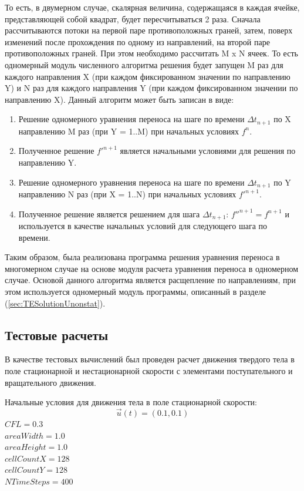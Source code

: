 \documentclass[12pt,a4paper]{article}
\begin{document}
То есть, в двумерном случае, скалярная величина, содержащаяся в каждая ячейке, представляющей собой квадрат, будет пересчитываться 2 раза. Сначала рассчитываются потоки на первой паре противоположных граней, затем, поверх изменений после прохождения по одному из направлений, на второй паре противоположных граней. При этом необходимо рассчитать M x N ячеек. То есть одномерный модуль численного алгоритма решения будет запущен M раз для каждого направления X (при каждом фиксированном значении по направлению Y) и N раз для каждого направления Y (при каждом фиксированном значении по направлению X).
Данный алгоритм может быть записан в виде:
\begin{enumerate}
\item {Решение одномерного уравнения переноса на шаге по времени $\Delta t_{n+1}$ по X направлению M раз (при Y = 1..M) при начальных условиях $f^{n}$.}
\item {Полученное решение $f'^{n+1}$ является начальными условиями для решения по направлению Y.}
\item {Решение одномерного уравнения переноса на шаге по времени $\Delta t_{n+1}$ по Y направлению N раз (при X = 1..N) при начальных условиях $f'^{n+1}$.}
\item {Полученное решение является решением для шага $\Delta t_{n+1}$: $f''^{n+1}=f^{n+1}$ и используется в качестве начальных условий для следующего шага по времени.}
\end{enumerate}

Таким образом, была реализована программа решения уравнения переноса в многомерном случае на основе модуля расчета уравнения переноса в одномерном случае. Основой данного алгоритма является расщепление по направлениям, при этом используется одномерный модуль программы, описанный в разделе (\ref{sec:TESolutionUnonstat}).

\subsection{Тестовые расчеты}
В качестве тестовых вычислений был проведен расчет движения твердого тела в поле стационарной и нестационарной скорости с элементами поступательного и вращательного движения.

Начальные условия для движения тела в поле стационарной скорости:
\[
\overrightarrow{u}(t)=(0.1, 0.1)
\]
$CFL=0.3$\\
$areaWidth=1.0$\\
$areaHeight=1.0$\\
$cellCountX=128$\\
$cellCountY=128$\\
$NTimeSteps=400$\\
\end{document}
